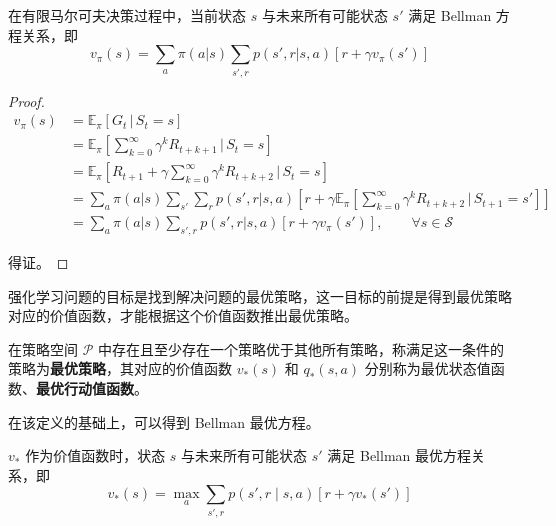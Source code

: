 \begin{Theorem}
    在有限马尔可夫决策过程中，当前状态 $s$ 与未来所有可能状态 $s'$ 满足 Bellman 方程关系，即
    \begin{equation}
        v_{\pi}(s) = \sum_a\pi(a|s)\sum_{s',r}p(s',r|s,a)\left[r+\gamma v_\pi(s') \right]
    \end{equation}
\end{Theorem}

\begin{proof}
    \[
    \begin{aligned} v_\pi(s) & = \mathbb{E}_\pi[G_t\,|\,S_t=s] \\ &=\mathbb{E}_\pi \left[\sum_{k=0}^\infty\gamma^kR_{t+k+1}\,|\,S_t=s \right] \\ &= \mathbb{E}_\pi \left [R_{t+1}+\gamma\sum_{k=0}^\infty\gamma^kR_{t+k+2}\,|\,S_t=s \right] \\ &=\sum_a\pi(a|s)\sum_{s'}\sum_rp(s',r|s,a)\left[r+\gamma \mathbb{E}_\pi \left[\sum_{k=0}^\infty\gamma^kR_{t+k+2}\,|\,S_{t+1}=s' \right] \right] \\ &= \sum_a\pi(a|s)\sum_{s',r}p(s',r|s,a)\left[r+\gamma v_\pi(s') \right], \qquad \forall s \in \mathcal S \end{aligned}
    \]

    得证。
\end{proof}

强化学习问题的目标是找到解决问题的最优策略，这一目标的前提是得到最优策略对应的价值函数，才能根据这个价值函数推出最优策略。

\begin{Definition}
    在策略空间 $\mathcal{P}$ 中存在且至少存在一个策略优于其他所有策略，称满足这一条件的策略为\textbf{最优策略}，其对应的价值函数 $v_*(s)$ 和 $q_*(s,a)$ 分别称为{最优状态值函数}、\textbf{最优行动值函数}。
\end{Definition}

在该定义的基础上，可以得到 Bellman 最优方程\cite{howard1960dynamic}。

\begin{Theorem}\label{the:optbellman}
    $v_*$ 作为价值函数时，状态 $s$ 与未来所有可能状态 $s'$ 满足 Bellman 最优方程关系，即
    \begin{equation}
        v_*(s)=\max_{a}\sum_{s',r}p(s',r \mid s,a)[r+\gamma v_*(s')]
    \end{equation}
\end{Theorem}

